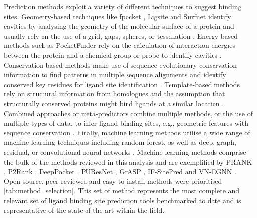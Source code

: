 Prediction methods exploit a variety of different techniques to suggest binding sites. Geometry-based techniques like fpocket \cite{GUILLOUX_2009_FPOCKET}, Ligsite \cite{HENDLICH_1997_LIGSITE} and Surfnet \cite{LASKOWSKI_1995_SURFNET} identify cavities by analysing the geometry of the molecular surface of a protein and usually rely on the use of a grid, gaps, spheres, or tessellation \cite{GUILLOUX_2009_FPOCKET, LIANG_1998_CAVITIES, HENDLICH_1997_LIGSITE, LASKOWSKI_1995_SURFNET, KLEYWEGT_1994_CAVITIES, LEVITT_1992_POCKET, BRADY_2000_PASS, WEISEL_2007_POCKETPICKER}. Energy-based methods such as PocketFinder \cite{AN_2005_POCKETFINDER} rely on the calculation of interaction energies between the protein and a chemical group or probe to identify cavities \cite{AN_2005_POCKETFINDER, GOODFORD_1982_PREDICTOR, AN_2004_PREDICTOR, LAURIE_2005_QSITEFINDER, GHERSI_2009_SITEHOUND, NGAN_2012_FTSITE}. Conservation-based methods make use of sequence evolutionary conservation information to find patterns in multiple sequence alignments and identify conserved key residues for ligand site identification \cite{ARMON_2001_CONSURF, PUPKO_2002_RATE4SITE, XIE_2012_CONSPRED}. Template-based methods rely on structural information from homologues and the assumption that structurally conserved proteins might bind ligands at a similar location \cite{ZVELEBIL_1987_PREDICTION, WASS_2010_3DLIGANDSITE, ROY_2012_COFACTOR, YANG_2013_COFACTOR, LEE_2013_PREDICTION, BRYLINSKI_2013_EFINDSITE}. Combined approaches or meta-predictors combine multiple methods, or the use of multiple types of data, to infer ligand binding sites, e.g., geometric features with sequence conservation \cite{GUTTERIDGE_2003_LBSP, HUANG_2006_BU48, GLASER_2006_PREDICTION, HALGREN_2009_PREDICITON, CAPRA_2009_CONCAVITY, HUANG_2009_METAPOCKET, BRAY_2009_SITESIDENTIFY, BRYLINSKI_2009_FINDSITE}. Finally, machine learning methods utilise a wide range of machine learning techniques including random forest, as well as deep, graph, residual, or convolutional neural networks \cite{KRIVAK_2015_PRANK, KRIVAK_2015_P2RANK, JIMENEZ_2017_DEEPSITE, KRIVAK_2018_P2RANK, SANTANA_2020_GRaSP, KOZLOVSKII_2020_BITENET, STEPNIEWSKA_2020_KALASANTY, KANDEL_2021_PURESNET, MYOLNAS_2021_DEEPSURF, YAN_2022_POINTSITE, LI_2022_RECURPOCKET, AGGARWAL_2022_DEEPPOCKET, ABDOLLAHI_2023_NODECODER, EVTEEV_2023_SITERADAR, LI_2023_GLPOCKET, ZHANG_2024_EQUIPOCKET, LIU_2023_REFINEPOCKET,  SMITH_2024_GrASP, CARBERY_2024_IFSP, SESTAK_2024_VNEGNN, KANDEL_2024_PURESNET}. Machine learning methods comprise the bulk of the methods reviewed in this analysis and are exemplified by PRANK \cite{KRIVAK_2015_PRANK}, P2Rank \cite{KRIVAK_2015_P2RANK, KRIVAK_2018_P2RANK}, DeepPocket \cite{AGGARWAL_2022_DEEPPOCKET}, PUResNet \cite{KANDEL_2021_PURESNET, KANDEL_2024_PURESNET}, GrASP \cite{SMITH_2024_GrASP}, IF-SitePred \cite{CARBERY_2024_IFSP} and VN-EGNN \cite{SESTAK_2024_VNEGNN}. Open source, peer-reviewed and easy-to-install methods were prioritised \autoref{tab:method_selection}. This set of method represents the most complete and relevant set of ligand binding site prediction tools benchmarked to date and is representative of the state-of-the-art within the field.

